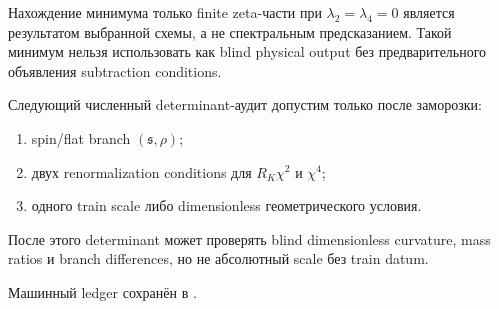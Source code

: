 \begin{nogocriterion}
Нахождение минимума только finite zeta-части при
\(\lambda_2=\lambda_4=0\) является результатом выбранной схемы, а не
спектральным предсказанием. Такой минимум нельзя использовать как blind
physical output без предварительного объявления subtraction conditions.
\end{nogocriterion}

\begin{protocol}
Следующий численный determinant-аудит допустим только после заморозки:
\begin{enumerate}
 \item spin/flat branch \((\mathfrak s,\rho)\);
 \item двух renormalization conditions для \(R_K\chi^2\) и \(\chi^4\);
 \item одного train scale либо dimensionless геометрического условия.
\end{enumerate}
После этого determinant может проверять blind dimensionless curvature,
mass ratios и branch differences, но не абсолютный scale без train datum.
\end{protocol}

Машинный ledger сохранён в
.